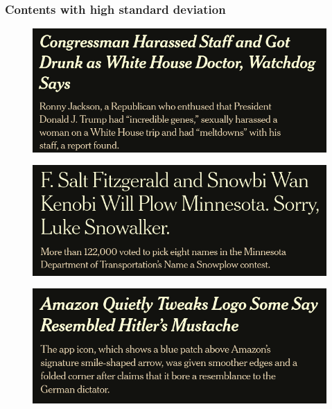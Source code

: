 \documentclass{beamer}
\begin{document}
\begin{frame}[c]
    \frametitle{Contents with high standard deviation}
    \begin{figure}[htpb]
        \centering
        \includegraphics[width=0.5\linewidth]{img/high_stddev/1.png}
    \end{figure}

    \begin{figure}[htpb]
        \centering
        \includegraphics[width=0.5\linewidth]{img/high_stddev/2.png}
    \end{figure}
    \begin{figure}[htpb]
        \centering
        \includegraphics[width=0.5\linewidth]{img/high_stddev/3.png}
    \end{figure}
\end{frame}
\end{document}
